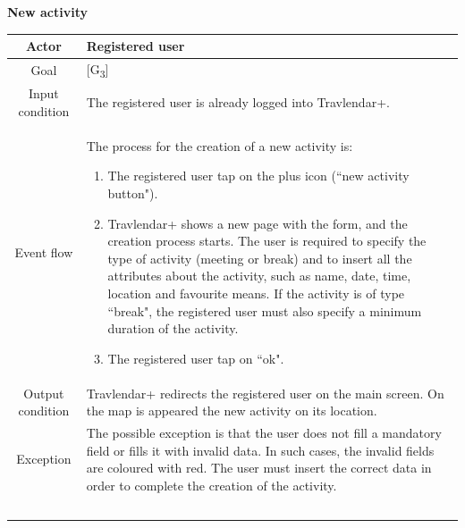 \documentclass[12pt,titlepage]{article}
\begin{document}
\clearpage
\newpage
 
\begin{flushleft}
\textbf{New activity}
\end{flushleft}


\begin{tabular}{cp{10cm}} 
Actor&Registered user\\ \hline 
Goal& {[G\textsubscript{3}]}\\ \hline
Input condition&The registered user is already logged into Travlendar+.\\ \hline
Event flow&The process for the creation of a new activity is: \begin{enumerate}
\item The registered user tap on the plus icon (``new activity button").
\item Travlendar+ shows a new page with the form, and the creation process starts. The user is required to specify the type of activity (meeting or break) and to insert all the attributes about the activity, such as name, date, time, location and favourite means. If the activity is of type ``break", the registered user must also specify a minimum duration of the activity.
\item The registered user tap on ``ok".
\end{enumerate} \\ \hline
Output condition& Travlendar+ redirects the registered user on the main screen. On the map is appeared the new activity on its location. 
\\ \hline
Exception& The possible exception is that the user does not fill a mandatory field or fills it with invalid data. In such cases, the invalid fields are coloured with red. The user must insert the correct data in order to complete the creation of the activity.

\\ \hline \

\end{tabular}
\pagebreak
\end{document}
